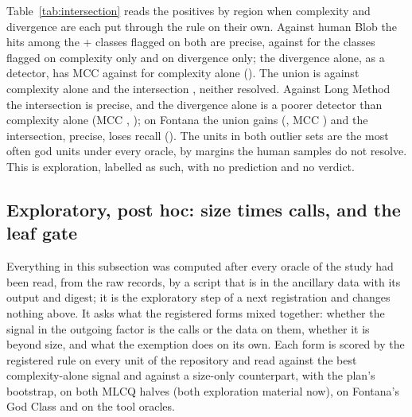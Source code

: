 \documentclass[11pt,a4paper]{article}
\newcommand{\madz}{modified $z \geq 3.5$}
\newcommand{\fitwidth}[1]{\resizebox{\ifdim\width>\textwidth\textwidth\else\width\fi}{!}{#1}}
\newcommand{\Xs}{X$^*$}
\newcommand{\Xm}{X$^*_m$}
\begin{document}
Table~\ref{tab:intersection} reads the positives by region when complexity
and divergence are each put through the rule on their own. Against human
Blob the \interBlobBothTp{} hits among the \interBlobBothTp{} +
\interBlobBothFp{} classes flagged on both are \interBlobBothPrecision{}
precise, against \interBlobXOnlyPrecision{} for the classes flagged on
complexity only and \interBlobDOnlyPrecision{} on divergence only; the
divergence alone, as a detector, has MCC \interBlobDMcc{} against
\primXMcc{} for complexity alone (\interBlobDVsX{}). The union is
\interBlobEitherVsX{} against complexity alone and the intersection
\interBlobBothVsX{}, neither resolved. Against Long Method the intersection
is \interLongBothPrecision{} precise, and the divergence alone is a poorer
detector than complexity alone (MCC \interLongDMcc{}, \interLongDVsX{});
on Fontana the union gains (\interFontanaEitherVsX{}, MCC
\interFontanaEitherMcc{}) and the intersection, \interFontanaBothPrecision{}
precise, loses recall (\interFontanaBothVsX{}). The units in both outlier
sets are the most often god units under every oracle, by margins the human
samples do not resolve. This is exploration, labelled as such, with no
prediction and no verdict.

\begin{table}[t]
\centering
\caption{Exploratory: the reviewed positives by region when the outliers of
\Xs{} (or \Xm{}) and of the second set are flagged separately by \madz{}.
Each region is hits/false positives among the reviewed units; the last
column is the pooled MCC of the union minus that of \Xs{}.}
\label{tab:intersection}
\small
\setlength{\tabcolsep}{4pt}
\fitwidth{}
\end{table}

\subsection{Exploratory, post hoc: size times calls, and the leaf gate}
\label{sec:explore-forms}

Everything in this subsection was computed after every oracle of the study
had been read, from the raw records, by a script that is in the ancillary
data with its output and digest; it is the exploratory step of a next
registration and changes nothing above. It asks what the registered forms
mixed together: whether the signal in the outgoing factor is the calls or
the data on them, whether it is beyond size, and what the exemption does on
its own. Each form is scored by the registered rule on every unit of the
repository and read against the best complexity-alone signal and against a
size-only counterpart, with the plan's bootstrap, on both MLCQ halves (both
exploration material now), on Fontana's God Class and on the tool oracles.
\end{document}
